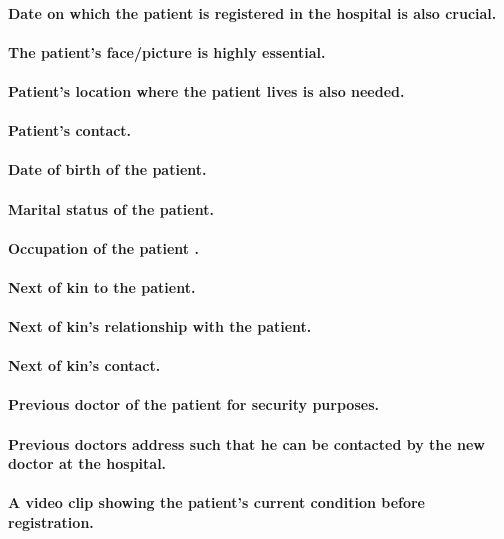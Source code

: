 \documentclass[10pt,a4paper]{article}
\begin{document}
\paragraph{Date on which the patient is registered in the hospital is also crucial.}
\paragraph{The patient's face/picture is highly essential.} 
\paragraph{Patient's location where the patient lives is also needed.}
\paragraph{Patient's contact.}
\paragraph{Date of birth of the patient.}
\paragraph{Marital status of the patient.}
\paragraph{Occupation of the patient .}
\paragraph{Next of kin to the patient.}
\paragraph{Next of kin's relationship with the patient.}
\paragraph{Next of kin's contact.}
\paragraph{Previous doctor of the patient for security purposes.}
\paragraph{Previous doctors address such that he can be contacted by the new doctor at the hospital.}
\paragraph{A video clip showing the patient's current condition before registration.}
\end{document}
